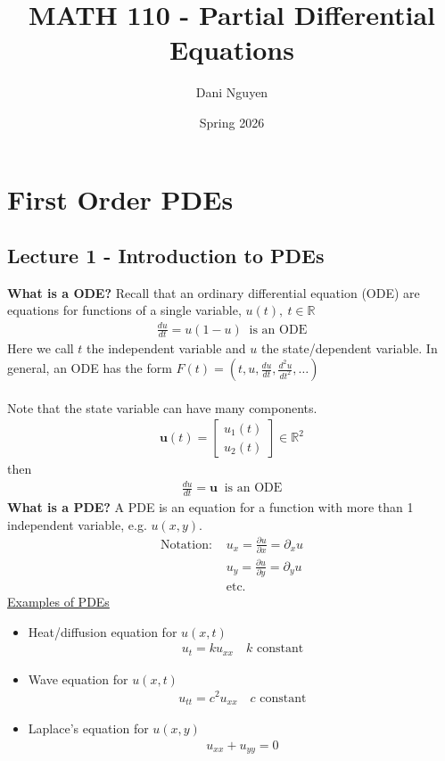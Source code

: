 \documentclass[12pt, letterpaper]{article}
\title{MATH 110 - Partial Differential Equations}
\author{Dani Nguyen}
\date{Spring 2026}
\begin{document}
\maketitle
\tableofcontents


\section{First Order PDEs}
\subsection{Lecture 1 - Introduction to PDEs}
\textbf{What is a ODE?} Recall that an ordinary differential equation (ODE) are 
equations for functions of a single variable, $u(t),\ t \in \mathbb{R}$
\begin{align*}
    \frac{du}{dt} = u (1-u) \ \text{ is an ODE}
\end{align*}
Here we call $t$ the independent variable and $u$ the state/dependent variable.
In general, an ODE has the form $F(t) = (t,u,\frac{du}{dt},\frac{d^2u}{dt^2},\dots)$ 
\\ \\
Note that the state variable can have many components.
\begin{align*}
    \mathbf{u}(t) = \begin{bmatrix}
        u_1(t) \\ u_2(t)
    \end{bmatrix} \in \mathbb{R}^2
\end{align*}
then 
\begin{align*}
    \frac{du}{dt} = \mathbf{u}\ \text{ is an ODE}
\end{align*}
\textbf{What is a PDE?} A PDE is an equation for a function with more than 1 
independent variable, e.g. $u(x,y)$.
\begin{align*}
    \text{Notation: } & u_x = \frac{\partial u}{\partial x} = \partial_x u \\
    & u_y = \frac{\partial u}{\partial y} = \partial_y u \\ 
    & \text{etc.}
\end{align*}
\underline{Examples of PDEs}
\begin{itemize}
    \item Heat/diffusion equation for $u(x,t)$ \begin{align*}
        u_t = ku_{xx} \quad k \text{ constant}
    \end{align*}
    \item Wave equation for $u(x,t)$ \begin{align*}
        u_{tt} = c^2u_{xx} \quad c \text{ constant}
    \end{align*}
    \item Laplace's equation for $u(x,y)$ \begin{align*}
        u_{xx} + u_{yy} = 0
    \end{align*}
\end{itemize}
\end{document}
